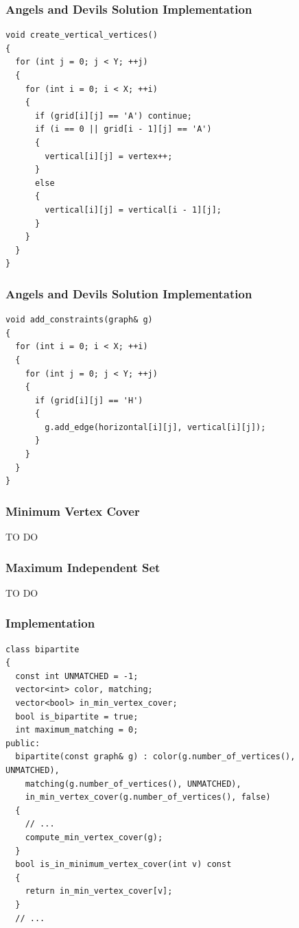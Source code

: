 \documentclass{beamer}
\begin{document}
\begin{frame}[containsverbatim]
\frametitle{Angels and Devils Solution Implementation}
\scriptsize

\begin{lstlisting}
void create_vertical_vertices()
{
  for (int j = 0; j < Y; ++j)
  {
    for (int i = 0; i < X; ++i)
    {
      if (grid[i][j] == 'A') continue;
      if (i == 0 || grid[i - 1][j] == 'A')
      {
        vertical[i][j] = vertex++;
      }
      else
      {
        vertical[i][j] = vertical[i - 1][j];
      }
    }
  }
}
\end{lstlisting}

\end{frame}

\begin{frame}[containsverbatim]
\frametitle{Angels and Devils Solution Implementation}
\scriptsize

\begin{lstlisting}
void add_constraints(graph& g)
{
  for (int i = 0; i < X; ++i)
  {
    for (int j = 0; j < Y; ++j)
    {
      if (grid[i][j] == 'H')
      {
        g.add_edge(horizontal[i][j], vertical[i][j]);
      }
    }
  }
}
\end{lstlisting}

\end{frame}

\fi

\begin{frame}%
\frametitle{Minimum Vertex Cover}

TO DO

\end{frame}

\begin{frame}%
\frametitle{Maximum Independent Set}

TO DO

\end{frame}

\begin{frame}[containsverbatim]
\frametitle{Implementation}
\scriptsize

\begin{lstlisting}
class bipartite
{
  const int UNMATCHED = -1;
  vector<int> color, matching;
  vector<bool> in_min_vertex_cover;
  bool is_bipartite = true;
  int maximum_matching = 0;
public:
  bipartite(const graph& g) : color(g.number_of_vertices(), UNMATCHED),
    matching(g.number_of_vertices(), UNMATCHED),
    in_min_vertex_cover(g.number_of_vertices(), false)
  {
    // ...
    compute_min_vertex_cover(g);
  }
  bool is_in_minimum_vertex_cover(int v) const
  {
    return in_min_vertex_cover[v];
  }
  // ...
\end{lstlisting}

\end{frame}
\end{document}
